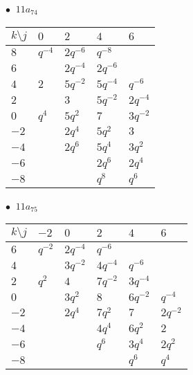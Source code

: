 \begin{minipage}{\linewidth}
$\bullet\ $ $11a_{74}$ \vspace{0.5em} \\
\begin{tabular}{l|llll}
$k \setminus j$ & $0$ & $2$ & $4$ & $6$ \\
\hline
$8$ & $q^{-4}$ & $2q^{-6}$ & $q^{-8}$ &  \\
$6$ &  & $2q^{-4}$ & $2q^{-6}$ &  \\
$4$ & $2$ & $5q^{-2}$ & $5q^{-4}$ & $q^{-6}$ \\
$2$ &  & $3$ & $5q^{-2}$ & $2q^{-4}$ \\
$0$ & $q^{4}$ & $5q^{2}$ & $7$ & $3q^{-2}$ \\
$-2$ &  & $2q^{4}$ & $5q^{2}$ & $3$ \\
$-4$ &  & $2q^{6}$ & $5q^{4}$ & $3q^{2}$ \\
$-6$ &  &  & $2q^{6}$ & $2q^{4}$ \\
$-8$ &  &  & $q^{8}$ & $q^{6}$ \\
\end{tabular}
\vspace{2em}
\end{minipage}
%
\begin{minipage}{\linewidth}
$\bullet\ $ $11a_{75}$ \vspace{0.5em} \\
\begin{tabular}{l|lllll}
$k \setminus j$ & $-2$ & $0$ & $2$ & $4$ & $6$ \\
\hline
$6$ & $q^{-2}$ & $2q^{-4}$ & $q^{-6}$ &  &  \\
$4$ &  & $3q^{-2}$ & $4q^{-4}$ & $q^{-6}$ &  \\
$2$ & $q^{2}$ & $4$ & $7q^{-2}$ & $3q^{-4}$ &  \\
$0$ &  & $3q^{2}$ & $8$ & $6q^{-2}$ & $q^{-4}$ \\
$-2$ &  & $2q^{4}$ & $7q^{2}$ & $7$ & $2q^{-2}$ \\
$-4$ &  &  & $4q^{4}$ & $6q^{2}$ & $2$ \\
$-6$ &  &  & $q^{6}$ & $3q^{4}$ & $2q^{2}$ \\
$-8$ &  &  &  & $q^{6}$ & $q^{4}$ \\
\end{tabular}
\vspace{2em}
\end{minipage}
%
